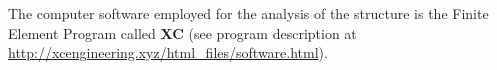 The computer software employed for the analysis of the structure is the Finite Element Program called \textbf{XC} (see program description at \url{http://xcengineering.xyz/html\_files/software.html}).

